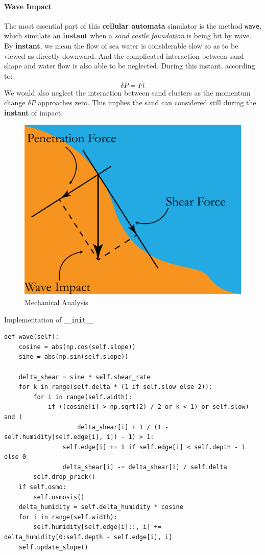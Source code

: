 \documentclass[12pt]{article}
\begin{document}
\paragraph{Wave Impact}
The most essential part of this \textbf{cellular automata} simulator is the method \texttt{wave}, which simulate an \textbf{instant} when a \textit{sand castle foundation} is being hit by wave. By \textbf{instant}, we mean the flow of sea water is considerable slow so as to be viewed as directly downward. And the complicated interaction between sand shape and water flow is also able to be neglected. During this instant, according to:
$$
\delta P = {F} \dot {t}
$$
We would also neglect the interaction between sand clusters as the momentum change $\delta P$ approaches zero. This implies the sand can considered still during the \textbf{instant} of impact.
\par

\begin{figure}[H]
    \caption{Mechanical Analysis}
    \label{fig:mechanical_analysis}
    \includegraphics{force_separation.eps}
\end{figure}

\begin{longlisting}
    \caption{Implementation of \texttt{\_\_init\_\_}}
    \begin{verbatim}
def wave(self):
    cosine = abs(np.cos(self.slope))
    sine = abs(np.sin(self.slope))

    delta_shear = sine * self.shear_rate
    for k in range(self.delta * (1 if self.slow else 2)):
        for i in range(self.width):
            if ((cosine[i] > np.sqrt(2) / 2 or k < 1) or self.slow) and (
                    delta_shear[i] + 1 / (1 - self.humidity[self.edge[i], i]) - 1) > 1:
                self.edge[i] += 1 if self.edge[i] < self.depth - 1 else 0
                delta_shear[i] -= delta_shear[i] / self.delta
        self.drop_prick()
    if self.osmo:
        self.osmosis()
    delta_humidity = self.delta_humidity * cosine
    for i in range(self.width):
        self.humidity[self.edge[i]::, i] += delta_humidity[0:self.depth - self.edge[i], i]
    self.update_slope()
    \end{verbatim}
\end{longlisting}
\end{document}
